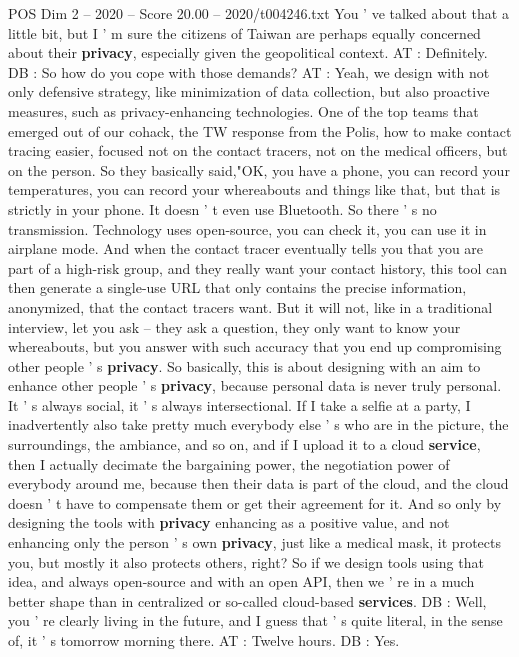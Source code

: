 \begin{textsample}{POS Dim 2 – 2020 – Score 20.00 – 2020/t004246.txt}
You ' ve talked about that a little bit, but I ' m sure the citizens of Taiwan are perhaps equally concerned about their \textbf{privacy}, especially given the geopolitical context.
AT : Definitely.
DB : So how do you cope with those demands?
AT : Yeah, we design with not only defensive strategy, like minimization of data collection, but also proactive measures, such as privacy-enhancing technologies.
One of the top teams that emerged out of our cohack, the TW response from the Polis, how to make contact tracing easier, focused not on the contact tracers, not on the medical officers, but on the person.
So they basically said,"OK, you have a phone, you can record your temperatures, you can record your whereabouts and things like that, but that is strictly in your phone.
It doesn ' t even use Bluetooth.
So there ' s no transmission.
Technology uses open-source, you can check it, you can use it in airplane mode.
And when the contact tracer eventually tells you that you are part of a high-risk group, and they really want your contact history, this tool can then generate a single-use URL that only contains the precise information, anonymized, that the contact tracers want.
But it will not, like in a traditional interview, let you ask -- they ask a question, they only want to know your whereabouts, but you answer with such accuracy that you end up compromising other people ' s \textbf{privacy}.
So basically, this is about designing with an aim to enhance other people ' s \textbf{privacy}, because personal data is never truly personal.
It ' s always social, it ' s always intersectional.
If I take a selfie at a party, I inadvertently also take pretty much everybody else ' s who are in the picture, the surroundings, the ambiance, and so on, and if I upload it to a cloud \textbf{service}, then I actually decimate the bargaining power, the negotiation power of everybody around me, because then their data is part of the cloud, and the cloud doesn ' t have to compensate them or get their agreement for it.
And so only by designing the tools with \textbf{privacy} enhancing as a positive value, and not enhancing only the person ' s own \textbf{privacy}, just like a medical mask, it protects you, but mostly it also protects others, right?
So if we design tools using that idea, and always open-source and with an open API, then we ' re in a much better shape than in centralized or so-called cloud-based \textbf{services}.
DB : Well, you ' re clearly living in the future, and I guess that ' s quite literal, in the sense of, it ' s tomorrow morning there.
AT : Twelve hours.
DB : Yes.

\end{textsample}
